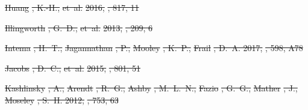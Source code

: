 \documentclass[numberedappendix]{emulateapj}
\providecommand{\DIFdel}[1]{{\protect\color{red}\sout{#1}}}                      %
\begin{document}
\DIFdel{Huang}%
\DIFdel{, K.-H., }%
\DIFdel{et~al.}%
\DIFdel{2016, }%
\DIFdel{, 817, 11
}%

\DIFdel{Illingworth}%
\DIFdel{, G.~D., }%
\DIFdel{et~al.}%
\DIFdel{2013, }%
\DIFdel{, 209, 6
}%

\DIFdel{Intema}%
\DIFdel{, H.~T., }%
\DIFdel{Jagannathan}%
\DIFdel{, P., }%
\DIFdel{Mooley}%
\DIFdel{, K.~P., }%
\DIFdel{Frail}%
\DIFdel{, D.~A. 2017,
  }%
\DIFdel{, 598, A78
}%

\DIFdel{Jacobs}%
\DIFdel{, D.~C., }%
\DIFdel{et~al.}%
\DIFdel{2015, }%
\DIFdel{, 801, 51
}%

\DIFdel{Kashlinsky}%
\DIFdel{, A., }%
\DIFdel{Arendt}%
\DIFdel{, R.~G., }%
\DIFdel{Ashby}%
\DIFdel{, M.~L.~N., }%
\DIFdel{Fazio}%
\DIFdel{, G.~G., }%
\DIFdel{Mather}%
\DIFdel{,
  J., }%
\DIFdel{Moseley}%
\DIFdel{, S.~H. 2012, }%
\DIFdel{, 753, 63
}%
\end{document}
